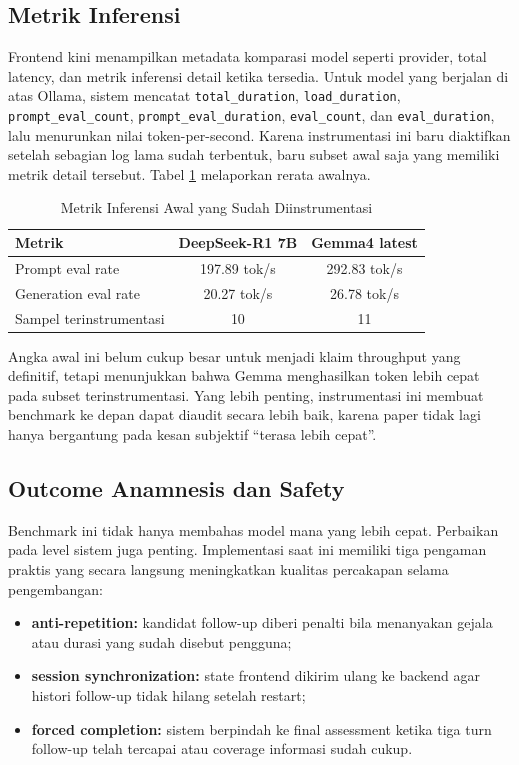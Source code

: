 \documentclass[conference]{IEEEtran}
\begin{document}
\subsection{Metrik Inferensi}
Frontend kini menampilkan metadata komparasi model seperti provider, total latency, dan metrik inferensi detail ketika tersedia. Untuk model yang berjalan di atas Ollama, sistem mencatat \texttt{total\_duration}, \texttt{load\_duration}, \texttt{prompt\_eval\_count}, \texttt{prompt\_eval\_duration}, \texttt{eval\_count}, dan \texttt{eval\_duration}, lalu menurunkan nilai token-per-second. Karena instrumentasi ini baru diaktifkan setelah sebagian log lama sudah terbentuk, baru subset awal saja yang memiliki metrik detail tersebut. Tabel \ref{tab:inference_metrics_id} melaporkan rerata awalnya.

\begin{table}[t]
\caption{Metrik Inferensi Awal yang Sudah Diinstrumentasi}
\label{tab:inference_metrics_id}
\centering
\footnotesize
\begin{tabular}{|l|c|c|}
\hline
\textbf{Metrik} & \textbf{DeepSeek-R1 7B} & \textbf{Gemma4 latest} \\
\hline
Prompt eval rate & 197.89 tok/s & 292.83 tok/s \\
\hline
Generation eval rate & 20.27 tok/s & 26.78 tok/s \\
\hline
Sampel terinstrumentasi & 10 & 11 \\
\hline
\end{tabular}
\end{table}

Angka awal ini belum cukup besar untuk menjadi klaim throughput yang definitif, tetapi menunjukkan bahwa Gemma menghasilkan token lebih cepat pada subset terinstrumentasi. Yang lebih penting, instrumentasi ini membuat benchmark ke depan dapat diaudit secara lebih baik, karena paper tidak lagi hanya bergantung pada kesan subjektif ``terasa lebih cepat''.

\subsection{Outcome Anamnesis dan Safety}
Benchmark ini tidak hanya membahas model mana yang lebih cepat. Perbaikan pada level sistem juga penting. Implementasi saat ini memiliki tiga pengaman praktis yang secara langsung meningkatkan kualitas percakapan selama pengembangan:
\begin{itemize}
\item \textbf{anti-repetition:} kandidat follow-up diberi penalti bila menanyakan gejala atau durasi yang sudah disebut pengguna;
\item \textbf{session synchronization:} state frontend dikirim ulang ke backend agar histori follow-up tidak hilang setelah restart;
\item \textbf{forced completion:} sistem berpindah ke final assessment ketika tiga turn follow-up telah tercapai atau coverage informasi sudah cukup.
\end{itemize}
\end{document}
